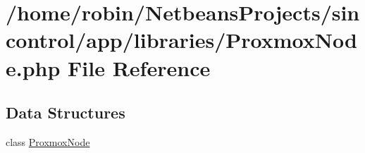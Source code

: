 \hypertarget{_proxmox_node_8php}{}\section{/home/robin/\+Netbeans\+Projects/sincontrol/app/libraries/\+Proxmox\+Node.php File Reference}
\label{_proxmox_node_8php}
\subsection*{Data Structures}
\begin{DoxyCompactItemize}
\item 
class \hyperlink{class_proxmox_node}{Proxmox\+Node}
\end{DoxyCompactItemize}
